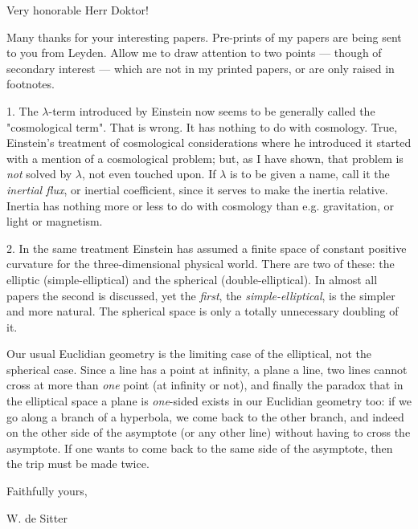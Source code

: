 \begin{letter}{7}
\begin{header}
\date{1920/05/25}

\makeheader

\end{header}

Very honorable Herr Doktor!

Many thanks for your interesting papers. Pre-prints of my papers are being sent to you from Leyden. Allow me to draw attention to two points — though of secondary interest — which are not in my printed papers, or are only raised in footnotes.

1. The $\lambda$-term introduced by Einstein now seems to be generally called the "cosmological term". That is wrong. It has nothing to do with cosmology. True, Einstein's treatment of cosmological considerations where he introduced it started with a mention of a cosmological problem; but, as I have shown, that problem is \textit{not} solved by $\lambda$, not even touched upon. If $\lambda$ is to be given a name, call it the \textit{inertial flux}, or inertial coefficient, since it serves to make the inertia relative. Inertia has nothing more or less to do with cosmology than e.g. gravitation, or light or magnetism.

2. In the same treatment Einstein has assumed a finite space of constant positive curvature for the three-dimensional physical world. There are two of these: the elliptic (simple-elliptical) and the spherical (double-elliptical). In almost all papers the second is discussed, yet the \textit{first}, the \textit{simple-elliptical}, is the simpler and more natural. The spherical space is only a totally unnecessary doubling of it.

Our usual Euclidian geometry is the limiting case of the elliptical, not the spherical case. Since a line has a point at infinity, a plane a line, two lines cannot cross at more than \textit{one} point (at infinity or not), and finally the paradox that in the elliptical space a plane is \textit{one}-sided exists in our Euclidian geometry too: if we go along a branch of a hyperbola, we come back to the other branch, and indeed on the other side of the asymptote (or any other line) without having to cross the asymptote. If one wants to come back to the same side of the asymptote, then the trip must be made twice.

Faithfully yours,

W. de Sitter

\end{letter}